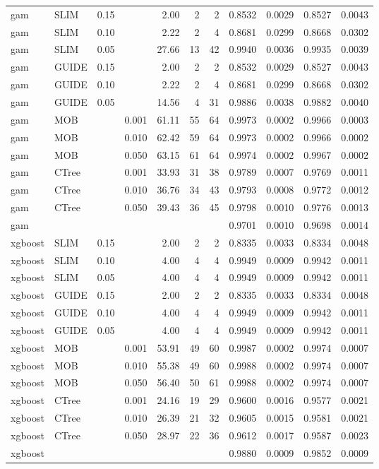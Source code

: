 \begin{table}
\begin{tabular}[t]{l|l|r|r|r|r|r|r|r|r|r}
\hline
gam & SLIM & 0.15 & & 2.00 & 2 & 2 & 0.8532 & 0.0029 & 0.8527 & 0.0043\\
gam & SLIM & 0.10 & & 2.22 & 2 & 4 & 0.8681 & 0.0299 & 0.8668 & 0.0302\\
gam & SLIM & 0.05 & & 27.66 & 13 & 42 & 0.9940 & 0.0036 & 0.9935 & 0.0039\\
gam & GUIDE & 0.15 & & 2.00 & 2 & 2 & 0.8532 & 0.0029 & 0.8527 & 0.0043\\
gam & GUIDE & 0.10 & & 2.22 & 2 & 4 & 0.8681 & 0.0299 & 0.8668 & 0.0302\\
gam & GUIDE & 0.05 & & 14.56 & 4 & 31 & 0.9886 & 0.0038 & 0.9882 & 0.0040\\
gam & MOB & & 0.001 & 61.11 & 55 & 64 & 0.9973 & 0.0002 & 0.9966 & 0.0003\\
gam & MOB & & 0.010 & 62.42 & 59 & 64 & 0.9973 & 0.0002 & 0.9966 & 0.0002\\
gam & MOB & & 0.050 & 63.15 & 61 & 64 & 0.9974 & 0.0002 & 0.9967 & 0.0002\\
gam & CTree & & 0.001 & 33.93 & 31 & 38 & 0.9789 & 0.0007 & 0.9769 & 0.0011\\
gam & CTree & & 0.010 & 36.76 & 34 & 43 & 0.9793 & 0.0008 & 0.9772 & 0.0012\\
gam & CTree & & 0.050 & 39.43 & 36 & 45 & 0.9798 & 0.0010 & 0.9776 & 0.0013\\

\hline
gam & & & & & & & 0.9701 & 0.0010 & 0.9698 & 0.0014\\
\hline

xgboost & SLIM & 0.15 & & 2.00 & 2 & 2 & 0.8335 & 0.0033 & 0.8334 & 0.0048\\
xgboost & SLIM & 0.10 & & 4.00 & 4 & 4 & 0.9949 & 0.0009 & 0.9942 & 0.0011\\
xgboost & SLIM & 0.05 & & 4.00 & 4 & 4 & 0.9949 & 0.0009 & 0.9942 & 0.0011\\
xgboost & GUIDE & 0.15 & & 2.00 & 2 & 2 & 0.8335 & 0.0033 & 0.8334 & 0.0048\\
xgboost & GUIDE & 0.10 & & 4.00 & 4 & 4 & 0.9949 & 0.0009 & 0.9942 & 0.0011\\
xgboost & GUIDE & 0.05 & & 4.00 & 4 & 4 & 0.9949 & 0.0009 & 0.9942 & 0.0011\\
xgboost & MOB & & 0.001 & 53.91 & 49 & 60 & 0.9987 & 0.0002 & 0.9974 & 0.0007\\
xgboost & MOB & & 0.010 & 55.38 & 49 & 60 & 0.9988 & 0.0002 & 0.9974 & 0.0007\\
xgboost & MOB & & 0.050 & 56.40 & 50 & 61 & 0.9988 & 0.0002 & 0.9974 & 0.0007\\
xgboost & CTree & & 0.001 & 24.16 & 19 & 29 & 0.9600 & 0.0016 & 0.9577 & 0.0021\\
xgboost & CTree &  & 0.010 & 26.39 & 21 & 32 & 0.9605 & 0.0015 & 0.9581 & 0.0021\\
xgboost & CTree & & 0.050 & 28.97 & 22 & 36 & 0.9612 & 0.0017 & 0.9587 & 0.0023\\
\hline
xgboost & & & & & & & 0.9880 & 0.0009 & 0.9852 & 0.0009\\
\hline


\end{tabular}
\end{table}
